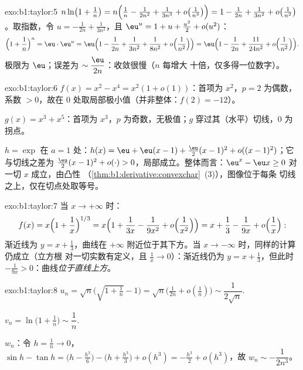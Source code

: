 \begin{solution}{exo:b1:taylor:5}
$n\ln\bigl(1 + \frac1n\bigr) = n\Bigl(\frac1n - \frac{1}{2n^2} +
\frac{1}{3n^3} + o\bigl(\frac{1}{n^3}\bigr)\Bigr) = 1 - \frac{1}{2n}
+ \frac{1}{3n^2} + o\bigl(\frac{1}{n^2}\bigr)$。取指数，令
$u = -\frac{1}{2n} + \frac{1}{3n^2}$，且 $\eu^u = 1 + u + \frac{u^2}2
+ o(u^2)$：
\[
\Bigl(1 + \frac1n\Bigr)^n = \eu\cdot \eu^{u}
= \eu\Bigl(1 - \frac{1}{2n} + \frac{1}{3n^2} + \frac{1}{8n^2}
+ o\Bigl(\frac{1}{n^2}\Bigr)\Bigr)
= \eu\Bigl(1 - \frac{1}{2n} + \frac{11}{24n^2} +
o\Bigl(\frac{1}{n^2}\Bigr)\Bigr).
\]
极限为 $\eu$；误差为 $\sim \dfrac{\eu}{2n}$：收敛很慢（$n$ 每增大
十倍，仅多得一位数字）。
\end{solution}

\begin{solution}{exo:b1:taylor:6}
$f(x) = x^2 - x^4 = x^2(1 + o(1))$：首项为 $x^2$，$p = 2$ 为偶数，
系数 $> 0$，故在 $0$ 处取局部极小值（并非整体：$f(2) = -12$）。

$g(x) = x^3 + x^5$：首项为 $x^3$，$p$ 为奇数，无极值；$g$
穿过其（水平）切线，$0$ 为拐点。

$h = \exp$ 在 $a = 1$ 处：$h(x) = \eu + \eu(x-1) + \frac{\eu}{2}(x-1)^2
+ o((x-1)^2)$；它与切线之差为
$\frac{\eu}{2}(x-1)^2 + o(\cdot) > 0$，局部成立。整体而言：$\eu^x -
\eu x \geq 0$ 对一切 $x$ 成立，由凸性
（\cref{thm:b1:derivative:convexchar}~(3)），图像位于每条
切线之上，仅在切点处取等号。
\end{solution}

\begin{solution}{exo:b1:taylor:7}
当 $x \to +\infty$ 时：
\[
f(x) = x\Bigl(1 + \frac1x\Bigr)^{1/3}
= x\Bigl(1 + \frac{1}{3x} - \frac{1}{9x^2} +
o\Bigl(\frac{1}{x^2}\Bigr)\Bigr)
= x + \frac13 - \frac{1}{9x} + o\Bigl(\frac1x\Bigr):
\]
渐近线为 $y = x + \frac13$，曲线在 $+\infty$ 附近位于其下方。当 $x
\to -\infty$ 时，同样的计算仍成立（立方根
对一切实数有定义，且 $\frac1x \to 0$）：渐近线仍为 $y = x +
\frac13$，但此时 $-\frac{1}{9x} > 0$：曲线\emph{位于直线上方}。
\end{solution}

\begin{solution}{exo:b1:taylor:8}
$u_n = \sqrt n\bigl(\sqrt{1 + \tfrac1n} - 1\bigr) = \sqrt
n\bigl(\frac{1}{2n} + o(\frac1n)\bigr) \sim \dfrac{1}{2\sqrt n}$.

$v_n = \ln\bigl(1 + \frac1n\bigr) \sim \dfrac 1n$.

$w_n$：令 $h = \frac1n \to 0$，$\sin h - \tan h = \bigl(h -
\frac{h^3}{6}\bigr) - \bigl(h + \frac{h^3}{3}\bigr) + o(h^3) =
-\frac{h^3}{2} + o(h^3)$，故 $w_n \sim -\dfrac{1}{2n^3}$。
\end{solution}

